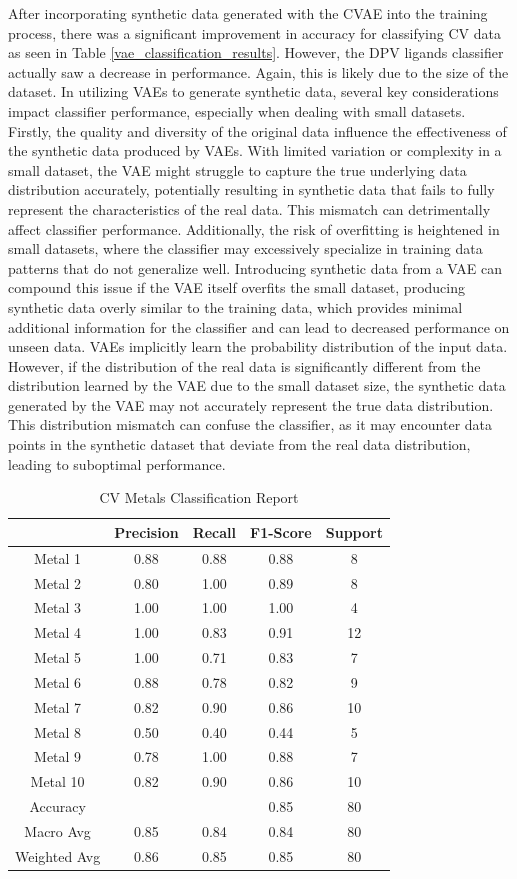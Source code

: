 After incorporating synthetic data generated with the CVAE into the training process, there was a significant improvement in accuracy for classifying CV data as seen in Table \ref{vae_classification_results}. However, the DPV ligands classifier actually saw a decrease in performance. Again, this is likely due to the size of the dataset. In utilizing VAEs to generate synthetic data, several key considerations impact classifier performance, especially when dealing with small datasets. Firstly, the quality and diversity of the original data influence the effectiveness of the synthetic data produced by VAEs. With limited variation or complexity in a small dataset, the VAE might struggle to capture the true underlying data distribution accurately, potentially resulting in synthetic data that fails to fully represent the characteristics of the real data. This mismatch can detrimentally affect classifier performance. Additionally, the risk of overfitting is heightened in small datasets, where the classifier may excessively specialize in training data patterns that do not generalize well. Introducing synthetic data from a VAE can compound this issue if the VAE itself overfits the small dataset, producing synthetic data overly similar to the training data, which provides minimal additional information for the classifier and can lead to decreased performance on unseen data. VAEs implicitly learn the probability distribution of the input data. However, if the distribution of the real data is significantly different from the distribution learned by the VAE due to the small dataset size, the synthetic data generated by the VAE may not accurately represent the true data distribution. This distribution mismatch can confuse the classifier, as it may encounter data points in the synthetic dataset that deviate from the real data distribution, leading to suboptimal performance.
\begin{table}[!h]
\begin{center}
\begin{tabular}{c|c|c|c|c}
 & Precision & Recall & F1-Score & Support\\
\hline
Metal 1 & 0.88 & 0.88 & 0.88 & 8\\
Metal 2 & 0.80 & 1.00 & 0.89 & 8\\
Metal 3 & 1.00 & 1.00 & 1.00 & 4\\
Metal 4 & 1.00 & 0.83 & 0.91 & 12\\
Metal 5 & 1.00 & 0.71 & 0.83 & 7\\
Metal 6 & 0.88 & 0.78 & 0.82 & 9\\
Metal 7 & 0.82 & 0.90 & 0.86 & 10\\
Metal 8 & 0.50 & 0.40 & 0.44 & 5\\
Metal 9 & 0.78 & 1.00 & 0.88 & 7\\
Metal 10 & 0.82 & 0.90 & 0.86 & 10\\
\hline
Accuracy & & & 0.85 & 80\\
Macro Avg & 0.85 & 0.84 & 0.84 & 80\\
Weighted Avg & 0.86 & 0.85 & 0.85 & 80
\end{tabular}
\caption{CV Metals Classification Report}
\label{cv_metal_report}
\end{center}
\end{table}
